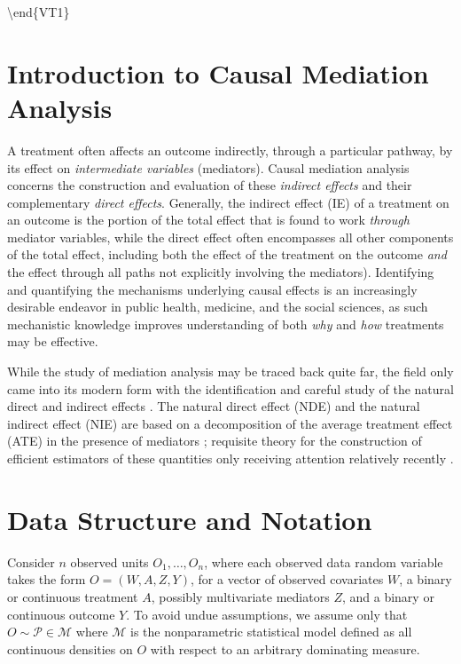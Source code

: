 \documentclass[
  12pt, krantz2,
]{krantz}
\theoremstyle{definition}
\theoremstyle{definition}
\theoremstyle{definition}
\newcommand{\M}{\mathcal{M}}
\newcommand{\1}{\mathbbm{1}}
\begin{document}
\textbackslash end\{VT1\}

\hypertarget{introduction-to-causal-mediation-analysis}{%
\section{Introduction to Causal Mediation Analysis}\label{introduction-to-causal-mediation-analysis}}

A treatment often affects an outcome indirectly, through a particular pathway,
by its effect on \emph{intermediate variables} (mediators). Causal mediation analysis
concerns the construction and evaluation of these \emph{indirect effects} and their
complementary \emph{direct effects}. Generally, the indirect effect (IE) of a
treatment on an outcome is the portion of the total effect that is found to work
\emph{through} mediator variables, while the direct effect often encompasses all
other components of the total effect, including both the effect of the treatment
on the outcome \emph{and} the effect through all paths not explicitly involving the
mediators). Identifying and quantifying the mechanisms underlying causal effects
is an increasingly desirable endeavor in public health, medicine, and the social
sciences, as such mechanistic knowledge improves understanding of both \emph{why} and
\emph{how} treatments may be effective.

While the study of mediation analysis may be traced back quite far, the field
only came into its modern form with the identification and careful study of the
natural direct and indirect effects \citep{robins1992identifiability, pearl2001direct}. The natural direct effect (NDE) and the natural indirect
effect (NIE) are based on a decomposition of the average treatment effect (ATE)
in the presence of mediators \citep{vanderweele2015explanation}; requisite
theory for the construction of efficient estimators of these quantities only
receiving attention relatively recently \citep{tchetgen2012semiparametric}.

\hypertarget{data-structure-and-notation-2}{%
\section{Data Structure and Notation}\label{data-structure-and-notation-2}}

Consider \(n\) observed units \(O_1, \ldots, O_n\), where each observed data random
variable takes the form \(O = (W, A, Z, Y)\), for a vector of observed covariates
\(W\), a binary or continuous treatment \(A\), possibly multivariate mediators \(Z\),
and a binary or continuous outcome \(Y\). To avoid undue assumptions, we assume
only that \(O \sim \mathcal{P} \in \M\) where \(\M\) is the nonparametric
statistical model defined as all continuous densities on \(O\) with respect to an
arbitrary dominating measure.
\end{document}
